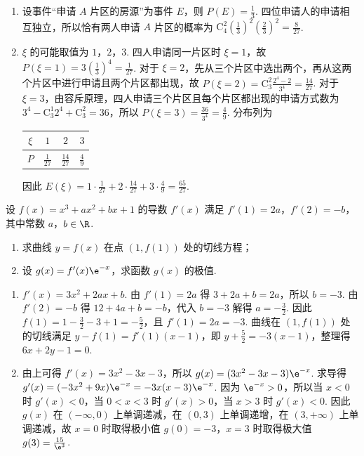 \begin{solution}
\begin{enumerate}
\item 设事件“申请 \(A\) 片区的房源”为事件 \(E\)，则 \(P(E)=\frac{1}{3}\). 四位申请人的申请相互独立，所以恰有两人申请 \(A\) 片区的概率为 \(\mathrm C_4^2\left(\frac{1}{3}\right)^2\left(\frac{2}{3}\right)^2=\frac{8}{27}\).
\item \(\xi\) 的可能取值为 \(1\)，\(2\)，\(3\). 四人申请同一片区时 \(\xi=1\)，故 \(P(\xi=1)=3\left(\frac{1}{3}\right)^4=\frac{1}{27}\). 对于 \(\xi=2\)，先从三个片区中选出两个，再从这两个片区中进行申请且两个片区都出现，故 \(P(\xi=2)=\mathrm C_3^2\frac{2^4-2}{3^4}=\frac{14}{27}\). 对于 \(\xi=3\)，由容斥原理，四人申请三个片区且每个片区都出现的申请方式数为 \(3^4-\mathrm C_3^1 2^4+\mathrm C_3^2=36\)，所以 \(P(\xi=3)=\frac{36}{3^4}=\frac{4}{9}\). 分布列为

\begin{center}
\begin{tabular}{c|ccc}
\(\xi\) & \(1\) & \(2\) & \(3\) \\
\hline
\(P\) & \(\frac{1}{27}\) & \(\frac{14}{27}\) & \(\frac{4}{9}\)
\end{tabular}
\end{center}

因此 \(E(\xi)=1\cdot\frac{1}{27}+2\cdot\frac{14}{27}+3\cdot\frac{4}{9}=\frac{65}{27}\).
\end{enumerate}
\end{solution}

\begin{problem}
设 \( f(x) = x^3 + ax^2 + bx + 1 \) 的导数 \( f'(x) \) 满足 \( f'(1) = 2a \)，\( f'(2) = -b \)，其中常数 \(a\)，\(b \in \R\).
\begin{enumerate}
\item 求曲线 \( y = f(x) \) 在点 \((1, f(1))\) 处的切线方程；
\item 设 \( g(x) = f'(x) \e^{-x} \)，求函数 \( g(x) \) 的极值.
\end{enumerate}
\end{problem}

\begin{solution}
\begin{enumerate}
\item \(f'(x)=3x^2+2ax+b\). 由 \(f'(1)=2a\) 得 \(3+2a+b=2a\)，所以 \(b=-3\). 由 \(f'(2)=-b\) 得 \(12+4a+b=-b\)，代入 \(b=-3\) 解得 \(a=-\frac{3}{2}\). 因此 \(f(1)=1-\frac{3}{2}-3+1=-\frac{5}{2}\)，且 \(f'(1)=2a=-3\). 曲线在 \((1,f(1))\) 处的切线满足 \(y-f(1)=f'(1)(x-1)\)，即 \(y+\frac{5}{2}=-3(x-1)\)，整理得 \(6x+2y-1=0\).
\item 由上可得 \(f'(x)=3x^2-3x-3\)，所以 \(g(x)=(3x^2-3x-3)\e^{-x}\). 求导得 \(g'(x)=(-3x^2+9x)\e^{-x}=-3x(x-3)\e^{-x}\). 因为 \(\e^{-x}>0\)，所以当 \(x<0\) 时 \(g'(x)<0\)，当 \(0<x<3\) 时 \(g'(x)>0\)，当 \(x>3\) 时 \(g'(x)<0\). 因此 \(g(x)\) 在 \((-\infty,0)\) 上单调递减，在 \((0,3)\) 上单调递增，在 \((3,+\infty)\) 上单调递减，故 \(x=0\) 时取得极小值 \(g(0)=-3\)，\(x=3\) 时取得极大值 \(g(3)=\frac{15}{\e^3}\).
\end{enumerate}
\end{solution}

